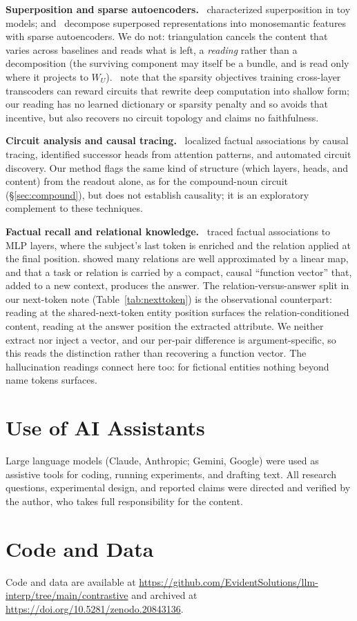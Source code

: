 \documentclass[11pt]{article}
\newcommand{\WU}{W_U}
\begin{document}
\textbf{Superposition and sparse autoencoders.}~\citet{elhage2022} characterized
superposition in toy models; \citet{bricken2023} and~\citet{templeton2024}
decompose superposed representations into monosemantic features with sparse
autoencoders. We do not: triangulation cancels the content that varies across
baselines and reads what is left, a \emph{reading} rather than a decomposition
(the surviving component may itself be a bundle, and is read only where it
projects to $\WU$).~\citet{lange2026} note that the sparsity objectives training
cross-layer transcoders can reward circuits that rewrite deep computation into
shallow form; our reading has no learned dictionary or sparsity penalty and so
avoids that incentive, but also recovers no circuit topology and claims no
faithfulness.

\textbf{Circuit analysis and causal tracing.}~\citet{meng2022} localized factual
associations by causal tracing, \citet{gould2024} identified successor heads from
attention patterns, and \citet{conmy2023} automated circuit discovery. Our method
flags the same kind of structure (which layers, heads, and content) from the
readout alone, as for the compound-noun circuit (\S\ref{sec:compound}), but does
not establish causality; it is an exploratory complement to these techniques.

\textbf{Factual recall and relational knowledge.}~\citet{geva2023} traced factual
associations to MLP layers, where the subject's last token is enriched and the
relation applied at the final position. \citet{hernandez2024} showed many
relations are well approximated by a linear map, and \citet{todd2024} that a task
or relation is carried by a compact, causal ``function vector'' that, added to a
new context, produces the answer. The relation-versus-answer split in our
next-token note (Table~\ref{tab:nexttoken}) is the observational counterpart:
reading at the shared-next-token entity position surfaces the relation-conditioned
content, reading at the answer position the extracted attribute. We neither
extract nor inject a vector, and our per-pair difference is argument-specific, so
this reads the distinction rather than recovering a function vector. The
hallucination readings connect here too: for fictional entities nothing beyond
name tokens surfaces.

\section*{Use of AI Assistants}

Large language models (Claude, Anthropic; Gemini, Google) were used as
assistive tools for coding, running experiments, and drafting text. All
research questions, experimental design, and reported claims were
directed and verified by the author, who takes full responsibility for
the content.

\section*{Code and Data}

Code and data are available at
\url{https://github.com/EvidentSolutions/llm-interp/tree/main/contrastive}
and archived at \url{https://doi.org/10.5281/zenodo.20843136}.



\end{document}
